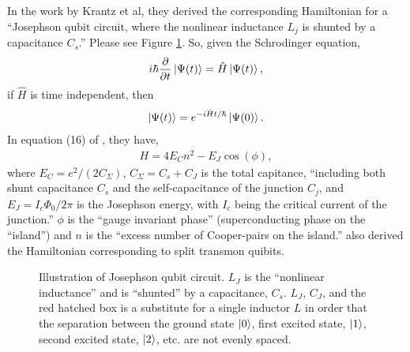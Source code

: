 \documentclass[a4paper,fleqn]{cas-sc}
\begin{document}
In the work by Krantz et al\cite{krantz2019quantum}, they derived the 
corresponding Hamiltonian for a ``Josephson qubit circuit, where the 
nonlinear inductance $L_{j}$ is shunted by a capacitance $C_{s}$.''
Please see Figure \ref{transmon_circuit}.  So, given the 
Schrodinger equation,
\begin{eqnarray}
i\hbar \frac{\partial}{\partial t} \ket{\Psi(t)} = \hat{H} \ket{\Psi(t)},
\end{eqnarray}
if $\hat{H}$ is time independent, then
\begin{eqnarray}
\ket{\Psi(t)}=e^{-i\hat{H}t/\hbar}\ket{\Psi(0)}.
\end{eqnarray}
In equation (16) of \cite{krantz2019quantum}, they have,
\begin{eqnarray}
H=4 E_{C} n^{2}-E_{J}\cos(\phi),
\end{eqnarray}
where $E_{C}=e^{2}/(2C_{\Sigma})$, $C_{\Sigma}=C_{s}+C_{J}$ is the total
capitance, ``including both shunt capacitance $C_{s}$ and the 
self-capacitance of the junction $C_{j}$, and $E_{J}=I_{c}\Phi_{0}/2\pi$
is the Josephson energy, with $I_{c}$ being the critical current of 
the junction.'' $\phi$ is the ``gauge invariant phase'' (superconducting
phase on the ``island'') and $n$ is the ``excess number of Cooper-pairs on
the island.'' \cite{krantz2019quantum} also derived the 
Hamiltonian corresponding to split transmon quibits.

\begin{figure}
\caption{Illustration of Josephson qubit circuit\cite{krantz2019quantum}.
  $L_{J}$ is the ``nonlinear inductance'' and is ``shunted'' by a 
  capacitance, $C_{s}$. $L_{J}$, $C_{J}$, and the red hatched
  box is a 
  substitute for a single inductor $L$ in order that the separation
  between the ground state $\ket{0}$, first excited state, $\ket{1}$,
  second excited state, $\ket{2}$, etc. are not evenly spaced. 
  \label{transmon_circuit} }
\end{figure}
\end{document}
